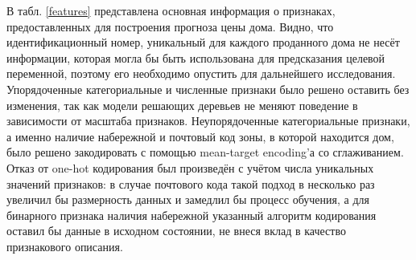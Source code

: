 \documentclass[a4paper, 14pt]{article}
\begin{document}
    В табл. \ref{features} представлена основная информация о признаках, предоставленных для построения прогноза цены дома. Видно, что идентификационный номер, уникальный для каждого проданного дома не несёт информации, которая могла бы быть использована для предсказания целевой переменной, поэтому его необходимо опустить для дальнейшего исследования. Упорядоченные категориальные и численные признаки было решено оставить без изменения, так как модели решающих деревьев не меняют поведение в зависимости от масштаба признаков. Неупорядоченные категориальные признаки, а именно наличие набережной и почтовый код зоны, в которой находится дом, было решено закодировать с помощью mean-target encoding'а со сглаживанием. Отказ от one-hot кодирования был произведён с учётом числа уникальных значений признаков: в случае почтового кода такой подход в несколько раз увеличил бы размерность данных и замедлил бы процесс обучения, а для бинарного признака наличия набережной указанный алгоритм кодирования оставил бы данные в исходном состоянии, не внеся вклад в качество признакового описания.
\end{document}
